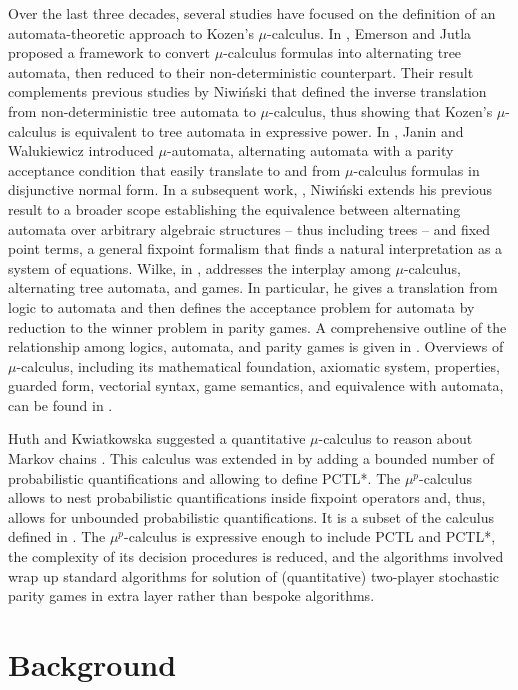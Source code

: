 \documentclass[a4paper,UKenglish]{oasics-v2016}
\begin{document}
Over the last three decades, several studies have focused on the definition of 
an automata-theoretic approach to Kozen's $\mu$-calculus.
In \cite{EJ91}, Emerson and Jutla proposed a framework to convert 
$\mu$-calculus formulas into alternating tree automata, then reduced to their 
non-deterministic counterpart.
Their result complements previous studies by Niwi\'{n}ski \cite{Ni88} that 
defined the inverse translation from non-deterministic tree automata to 
$\mu$-calculus, thus showing that Kozen's $\mu$-calculus is equivalent to 
tree automata in expressive power.
In \cite{JW95}, Janin and Walukiewicz introduced $\mu$-automata, alternating 
automata with a parity acceptance condition that easily translate to and from 
$\mu$-calculus formulas in disjunctive normal form.
In a subsequent work, \cite{Ni97}, Niwi\'{n}ski extends his previous result to 
a broader scope establishing the equivalence between alternating automata over 
arbitrary algebraic structures -- thus including trees -- and fixed point 
terms, a general fixpoint formalism that finds a natural interpretation as a 
system of equations.
Wilke, in \cite{Wil01}, addresses the interplay among $\mu$-calculus, 
alternating tree automata, and games.
In particular, he gives a translation from logic to automata and then defines 
the acceptance problem for automata by reduction to the winner problem in 
parity games.
A comprehensive outline of the relationship among logics, automata, and parity 
games
is given in \cite{GTW02}. Overviews of $\mu$-calculus, including its 
mathematical foundation, axiomatic system, properties, guarded form, vectorial 
syntax, game semantics, and equivalence with automata, can be found in 
\cite{AN01,BBW07,BS07,BW15}.

Huth and Kwiatkowska suggested a quantitative $\mu$-calculus to reason
about Markov chains \cite{HK97}.
This calculus was extended in \cite{CIN05} by adding a bounded number
of probabilistic quantifications and allowing to define PCTL*.
The $\mu^p$-calculus allows to nest probabilistic quantifications
inside fixpoint operators and, thus, allows for unbounded
probabilistic quantifications.
It is a subset of the calculus defined in \cite{Mio2012a,MS15}.
The $\mu^p$-calculus is 
expressive enough to include PCTL 
and PCTL*, the complexity of its decision procedures is reduced, and
the algorithms involved wrap up standard algorithms for solution of
(quantitative) two-player stochastic parity games in extra layer
rather than bespoke algorithms. 

%
%
%
\section{Background}
%
%
%
\end{document}
